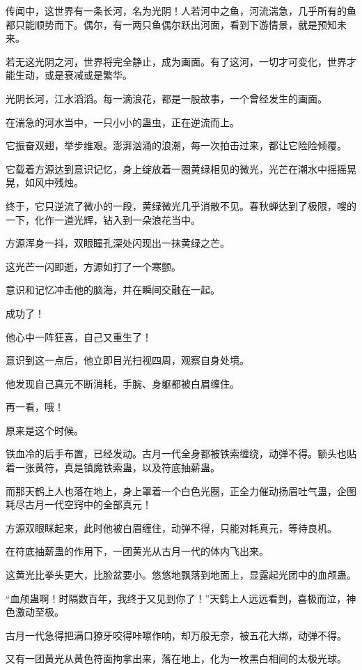 \begin{this_body}
传闻中，这世界有一条长河，名为光阴！人若河中之鱼，河流湍急，几乎所有的鱼都只能顺势而下。偶尔，有一两只鱼偶尔跃出河面，看到下游情景，就是预知未来。

若无这光阴之河，世界将完全静止，成为画面。有了这河，一切才可变化，世界才能生动，或是衰减或是繁华。

光阴长河，江水滔滔。每一滴浪花，都是一股故事，一个曾经发生的画面。

在湍急的河水当中，一只小小的蛊虫，正在逆流而上。

它振奋双翅，举步维艰。澎湃汹涌的浪潮，每一次拍击过来，都让它险险倾覆。

它载着方源达到意识记忆，身上绽放着一圈黄绿相见的微光，光芒在潮水中摇摇晃晃，如风中残烛。

终于，它只逆流了微小的一段，黄绿微光几乎消散不见。春秋蝉达到了极限，嗖的一下，化作一道光辉，钻入到一朵浪花当中。

方源浑身一抖，双眼瞳孔深处闪现出一抹黄绿之芒。

这光芒一闪即逝，方源如打了一个寒颤。

意识和记忆冲击他的脑海，并在瞬间交融在一起。

成功了！

他心中一阵狂喜，自己又重生了！

意识到这一点后，他立即目光扫视四周，观察自身处境。

他发现自己真元不断消耗，手腕、身躯都被白眉缠住。

再一看，哦！

原来是这个时候。

铁血冷的后手布置，已经发动。古月一代全身都被铁索缠绕，动弹不得。额头也贴着一张黄符，真是镇魔铁索蛊，以及符底抽薪蛊。

而那天鹤上人也落在地上，身上罩着一个白色光圈，正全力催动扬眉吐气蛊，企图耗尽古月一代空窍中的全部真元！

方源双眼眯起来，此时他被白眉缠住，动弹不得，只能对耗真元，等待良机。

在符底抽薪蛊的作用下，一团黄光从古月一代的体内飞出来。

这黄光比拳头更大，比脸盆要小。悠悠地飘落到地面上，显露起光团中的血颅蛊。

“血颅蛊啊！时隔数百年，我终于又见到你了！”天鹤上人远远看到，喜极而泣，神色激动至极。

古月一代急得把满口獠牙咬得咔嚓作响，却万般无奈，被五花大绑，动弹不得。

又有一团黄光从黄色符面拘拿出来，落在地上，化为一枚黑白相间的太极光球。


\end{this_body}
